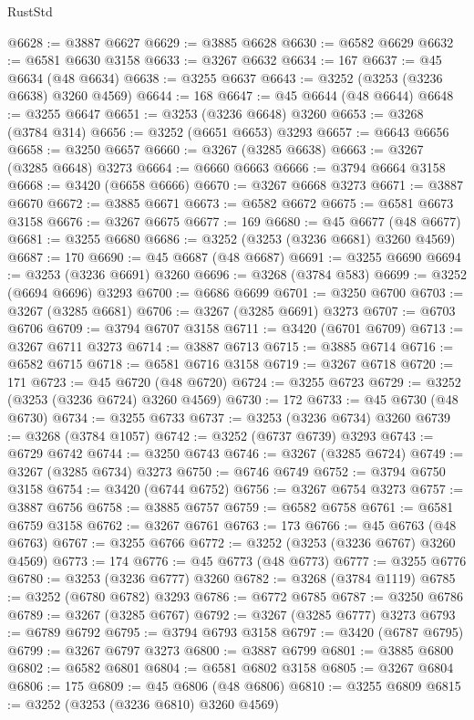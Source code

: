 \begin{lexlean}{RustStd}
\begin{coremodule}
@6628 := @3887 @6627
@6629 := @3885 @6628
@6630 := @6582 @6629
@6632 := @6581 @6630 @3158
@6633 := @3267 @6632
@6634 := 167
@6637 := @45 @6634 (@48 @6634)
@6638 := @3255 @6637
@6643 := @3252 (@3253 (@3236 @6638) @3260 @4569)
@6644 := 168
@6647 := @45 @6644 (@48 @6644)
@6648 := @3255 @6647
@6651 := @3253 (@3236 @6648) @3260
@6653 := @3268 (@3784 @314)
@6656 := @3252 (@6651 @6653) @3293
@6657 := @6643 @6656
@6658 := @3250 @6657
@6660 := @3267 (@3285 @6638)
@6663 := @3267 (@3285 @6648) @3273
@6664 := @6660 @6663
@6666 := @3794 @6664 @3158
@6668 := @3420 (@6658 @6666)
@6670 := @3267 @6668 @3273
@6671 := @3887 @6670
@6672 := @3885 @6671
@6673 := @6582 @6672
@6675 := @6581 @6673 @3158
@6676 := @3267 @6675
@6677 := 169
@6680 := @45 @6677 (@48 @6677)
@6681 := @3255 @6680
@6686 := @3252 (@3253 (@3236 @6681) @3260 @4569)
@6687 := 170
@6690 := @45 @6687 (@48 @6687)
@6691 := @3255 @6690
@6694 := @3253 (@3236 @6691) @3260
@6696 := @3268 (@3784 @583)
@6699 := @3252 (@6694 @6696) @3293
@6700 := @6686 @6699
@6701 := @3250 @6700
@6703 := @3267 (@3285 @6681)
@6706 := @3267 (@3285 @6691) @3273
@6707 := @6703 @6706
@6709 := @3794 @6707 @3158
@6711 := @3420 (@6701 @6709)
@6713 := @3267 @6711 @3273
@6714 := @3887 @6713
@6715 := @3885 @6714
@6716 := @6582 @6715
@6718 := @6581 @6716 @3158
@6719 := @3267 @6718
@6720 := 171
@6723 := @45 @6720 (@48 @6720)
@6724 := @3255 @6723
@6729 := @3252 (@3253 (@3236 @6724) @3260 @4569)
@6730 := 172
@6733 := @45 @6730 (@48 @6730)
@6734 := @3255 @6733
@6737 := @3253 (@3236 @6734) @3260
@6739 := @3268 (@3784 @1057)
@6742 := @3252 (@6737 @6739) @3293
@6743 := @6729 @6742
@6744 := @3250 @6743
@6746 := @3267 (@3285 @6724)
@6749 := @3267 (@3285 @6734) @3273
@6750 := @6746 @6749
@6752 := @3794 @6750 @3158
@6754 := @3420 (@6744 @6752)
@6756 := @3267 @6754 @3273
@6757 := @3887 @6756
@6758 := @3885 @6757
@6759 := @6582 @6758
@6761 := @6581 @6759 @3158
@6762 := @3267 @6761
@6763 := 173
@6766 := @45 @6763 (@48 @6763)
@6767 := @3255 @6766
@6772 := @3252 (@3253 (@3236 @6767) @3260 @4569)
@6773 := 174
@6776 := @45 @6773 (@48 @6773)
@6777 := @3255 @6776
@6780 := @3253 (@3236 @6777) @3260
@6782 := @3268 (@3784 @1119)
@6785 := @3252 (@6780 @6782) @3293
@6786 := @6772 @6785
@6787 := @3250 @6786
@6789 := @3267 (@3285 @6767)
@6792 := @3267 (@3285 @6777) @3273
@6793 := @6789 @6792
@6795 := @3794 @6793 @3158
@6797 := @3420 (@6787 @6795)
@6799 := @3267 @6797 @3273
@6800 := @3887 @6799
@6801 := @3885 @6800
@6802 := @6582 @6801
@6804 := @6581 @6802 @3158
@6805 := @3267 @6804
@6806 := 175
@6809 := @45 @6806 (@48 @6806)
@6810 := @3255 @6809
@6815 := @3252 (@3253 (@3236 @6810) @3260 @4569)

\end{coremodule}
\end{lexlean}
